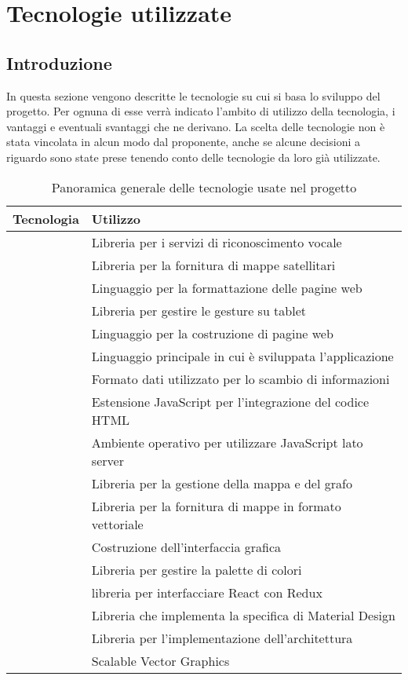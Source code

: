 \newpage

\section{Tecnologie utilizzate}
\label{tecnologie}
\subsection{Introduzione}
In questa sezione vengono descritte le tecnologie su cui si basa lo sviluppo del progetto. Per ognuna di esse verrà indicato l'ambito di utilizzo della tecnologia, i vantaggi e eventuali svantaggi che ne derivano. La scelta delle tecnologie non è stata vincolata in alcun modo dal proponente, anche se alcune decisioni a riguardo sono state prese tenendo conto delle tecnologie da loro già utilizzate.

\begin{table}[H]
	\centering
	\begin{tabular}{cl}
		\toprule
		Tecnologia & Utilizzo \\
		\midrule
		\nameref{Alexa Voice Service} & Libreria per i servizi di riconoscimento vocale \\
		\nameref{Bing Map} & Libreria per la fornitura di mappe satellitari \\
		\nameref{CSS3} & Linguaggio per la formattazione delle pagine web \\
		\nameref{HammerJS} & Libreria per gestire le gesture su tablet \\
		\nameref{HTML5} & Linguaggio per la costruzione di pagine web \\
		\nameref{JavaScript ES6}  & Linguaggio principale in cui è sviluppata l'applicazione \\
		\nameref{JSON} & Formato dati utilizzato per lo scambio di informazioni \\
		\nameref{JSX} & Estensione JavaScript per l'integrazione del codice HTML \\
		\nameref{Node.js} & Ambiente operativo per utilizzare JavaScript lato server \\
		\nameref{OpenLayers} & Libreria per la gestione della mappa e del grafo \\
		\nameref{Open Street Map} & Libreria per la fornitura di mappe in formato vettoriale \\
		\nameref{React} & Costruzione dell'interfaccia grafica \\
		\nameref{ReactColor} & Libreria per gestire la palette di colori \\
		\nameref{React-Redux} & libreria per interfacciare React con Redux \\ 
		\nameref{React Toolbox} & Libreria che implementa la specifica di Material Design \\
		\nameref{Redux}  & Libreria per l'implementazione dell'architettura \\
		\nameref{SVG} & Scalable Vector Graphics \\
		
		\bottomrule
	\end{tabular}
	\caption{Panoramica generale delle tecnologie usate nel progetto}
\end{table}




